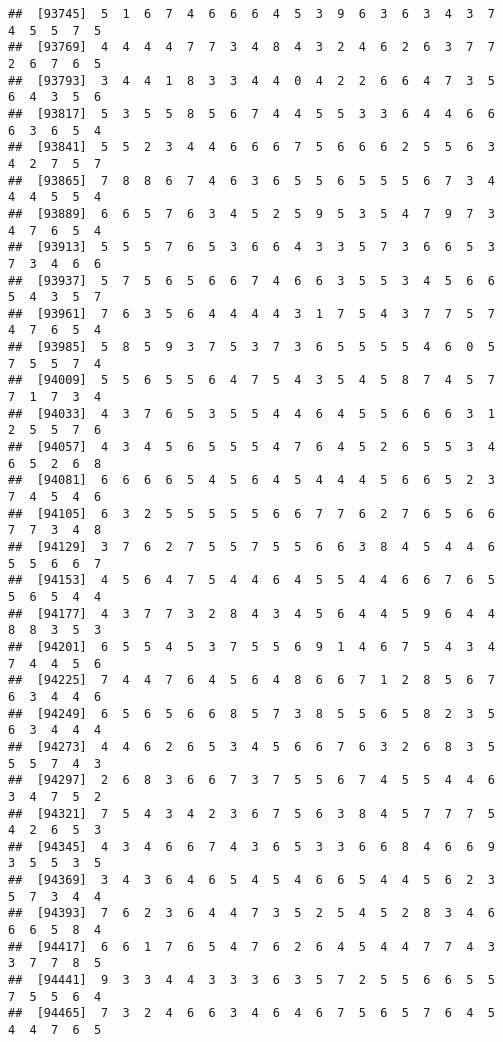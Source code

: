\documentclass[
]{book}
\begin{document}
\begin{verbatim}
##  [93745]  5  1  6  7  4  6  6  6  4  5  3  9  6  3  6  3  4  3  7  4  5  5  7  5
##  [93769]  4  4  4  4  7  7  3  4  8  4  3  2  4  6  2  6  3  7  7  2  6  7  6  5
##  [93793]  3  4  4  1  8  3  3  4  4  0  4  2  2  6  6  4  7  3  5  6  4  3  5  6
##  [93817]  5  3  5  5  8  5  6  7  4  4  5  5  3  3  6  4  4  6  6  6  3  6  5  4
##  [93841]  5  5  2  3  4  4  6  6  6  7  5  6  6  6  2  5  5  6  3  4  2  7  5  7
##  [93865]  7  8  8  6  7  4  6  3  6  5  5  6  5  5  5  6  7  3  4  4  4  5  5  4
##  [93889]  6  6  5  7  6  3  4  5  2  5  9  5  3  5  4  7  9  7  3  4  7  6  5  4
##  [93913]  5  5  5  7  6  5  3  6  6  4  3  3  5  7  3  6  6  5  3  7  3  4  6  6
##  [93937]  5  7  5  6  5  6  6  7  4  6  6  3  5  5  3  4  5  6  6  5  4  3  5  7
##  [93961]  7  6  3  5  6  4  4  4  4  3  1  7  5  4  3  7  7  5  7  4  7  6  5  4
##  [93985]  5  8  5  9  3  7  5  3  7  3  6  5  5  5  5  4  6  0  5  7  5  5  7  4
##  [94009]  5  5  6  5  5  6  4  7  5  4  3  5  4  5  8  7  4  5  7  7  1  7  3  4
##  [94033]  4  3  7  6  5  3  5  5  4  4  6  4  5  5  6  6  6  3  1  2  5  5  7  6
##  [94057]  4  3  4  5  6  5  5  5  4  7  6  4  5  2  6  5  5  3  4  6  5  2  6  8
##  [94081]  6  6  6  6  5  4  5  6  4  5  4  4  4  5  6  6  5  2  3  7  4  5  4  6
##  [94105]  6  3  2  5  5  5  5  5  6  6  7  7  6  2  7  6  5  6  6  7  7  3  4  8
##  [94129]  3  7  6  2  7  5  5  7  5  5  6  6  3  8  4  5  4  4  6  5  5  6  6  7
##  [94153]  4  5  6  4  7  5  4  4  6  4  5  5  4  4  6  6  7  6  5  5  6  5  4  4
##  [94177]  4  3  7  7  3  2  8  4  3  4  5  6  4  4  5  9  6  4  4  8  8  3  5  3
##  [94201]  6  5  5  4  5  3  7  5  5  6  9  1  4  6  7  5  4  3  4  7  4  4  5  6
##  [94225]  7  4  4  7  6  4  5  6  4  8  6  6  7  1  2  8  5  6  7  6  3  4  4  6
##  [94249]  6  5  6  5  6  6  8  5  7  3  8  5  5  6  5  8  2  3  5  6  3  4  4  4
##  [94273]  4  4  6  2  6  5  3  4  5  6  6  7  6  3  2  6  8  3  5  5  5  7  4  3
##  [94297]  2  6  8  3  6  6  7  3  7  5  5  6  7  4  5  5  4  4  6  3  4  7  5  2
##  [94321]  7  5  4  3  4  2  3  6  7  5  6  3  8  4  5  7  7  7  5  4  2  6  5  3
##  [94345]  4  3  4  6  6  7  4  3  6  5  3  3  6  6  8  4  6  6  9  3  5  5  3  5
##  [94369]  3  4  3  6  4  6  5  4  5  4  6  6  5  4  4  5  6  2  3  5  7  3  4  4
##  [94393]  7  6  2  3  6  4  4  7  3  5  2  5  4  5  2  8  3  4  6  6  6  5  8  4
##  [94417]  6  6  1  7  6  5  4  7  6  2  6  4  5  4  4  7  7  4  3  3  7  7  8  5
##  [94441]  9  3  3  4  4  3  3  3  6  3  5  7  2  5  5  6  6  5  5  7  5  5  6  4
##  [94465]  7  3  2  4  6  6  3  4  6  4  6  7  5  6  5  7  6  4  5  4  4  7  6  5

\end{verbatim}
\end{document}
